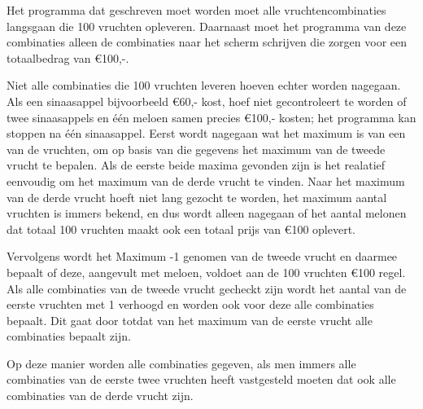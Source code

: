 Het programma dat geschreven moet worden moet alle vruchtencombinaties langsgaan die 100 vruchten opleveren. Daarnaast moet het programma van deze combinaties alleen de combinaties naar het scherm schrijven die zorgen voor een totaalbedrag van \euro 100,-.

Niet alle combinaties die 100 vruchten leveren hoeven echter worden nagegaan. Als een sinaasappel bijvoorbeeld \euro60,- kost, hoef niet gecontroleert te worden of twee sinaasappels en \'e\'en meloen samen precies \euro 100,- kosten; het programma kan stoppen na \'e\'en sinaasappel. 
Eerst wordt nagegaan wat het maximum is van een van de vruchten, om op basis van die gegevens het maximum van de tweede vrucht te bepalen.
Als de eerste beide maxima gevonden zijn is het realatief eenvoudig om het maximum van de derde vrucht te vinden.
Naar het maximum van de derde vrucht hoeft niet lang gezocht te worden, het maximum aantal vruchten is immers bekend, en dus wordt alleen nagegaan of het aantal melonen dat totaal 100 vruchten maakt ook een totaal prijs van \euro 100 oplevert.

Vervolgens wordt het Maximum -1 genomen van de tweede vrucht en  daarmee bepaalt of deze, aangevult met meloen, voldoet aan de 100 vruchten \euro100 regel.
Als alle combinaties van de tweede vrucht gecheckt zijn wordt het aantal van de eerste vruchten met 1 verhoogd en worden ook voor deze alle combinaties bepaalt.
Dit gaat door totdat van het maximum van de eerste vrucht alle combinaties bepaalt zijn.

Op deze manier worden alle combinaties gegeven, als men immers alle combinaties van de eerste twee vruchten heeft vastgesteld moeten dat ook alle combinaties van de derde vrucht zijn.
